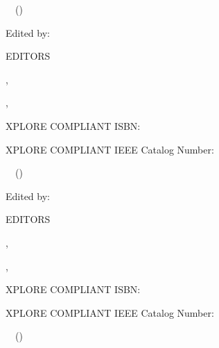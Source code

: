 \documentclass[letterpaper,oneside]{book}
\begin{document}
\frontmatter
%
\pagestyle{empty}
\null\vspace{5cm}
\begin{center}
\Huge \year\ \conferencename\ 
(\acronym)

\vspace{2cm}
\Large
Edited by:

EDITORS

\vspace{2cm}
\large
\monthday, \year

\vspace{2cm}

\city, \country

\vspace{5cm}

XPLORE COMPLIANT ISBN: \isbn

XPLORE COMPLIANT IEEE Catalog Number: \catalognumber

\end{center}
\newpage
\pagestyle{plain}
\null\vspace{5cm}
{}
\begin{center}
\Huge \year\ \conferencename\ 
(\acronym)

\vspace{2cm}
\Large
Edited by:

EDITORS

\vspace{2cm}
\large
\monthday, \year

\vspace{2cm}

\city, \country

\vspace{5cm}

XPLORE COMPLIANT ISBN: \isbn

XPLORE COMPLIANT IEEE Catalog Number: \catalognumber

\end{center}
\newpage
\begin{center}
{}
\null\vspace{7.0cm}
\end{center}

 \year\ \conferencename\ (\acronym)
\end{document}
